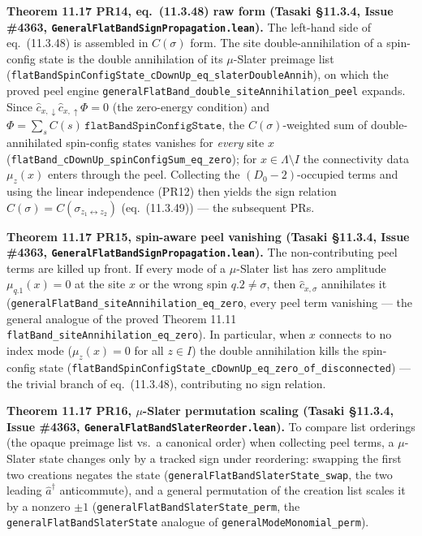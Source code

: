 \documentclass[a4paper,11pt]{article}
\begin{document}
\medskip\noindent\textbf{Theorem 11.17 PR14, eq.~(11.3.48) raw form (Tasaki §11.3.4, Issue \#4363,
\texttt{GeneralFlatBandSignPropagation.lean}).}  The left-hand side of eq.~(11.3.48) is assembled in
$C(\sigma)$ form.  The site double-annihilation of a spin-config state is the double annihilation of
its $\mu$-Slater preimage list (\texttt{flatBandSpinConfigState\_cDownUp\_eq\_slaterDoubleAnnih}),
on which the proved peel engine \texttt{generalFlatBand\_double\_siteAnnihilation\_peel} expands.
Since $\hat c_{x,\downarrow}\hat c_{x,\uparrow}\Phi=0$ (the zero-energy condition) and
$\Phi=\sum_s C(s)\,\texttt{flatBandSpinConfigState}$, the $C(\sigma)$-weighted sum of
double-annihilated spin-config states vanishes for \emph{every} site $x$
(\texttt{flatBand\_cDownUp\_spinConfigSum\_eq\_zero}); for $x\in\Lambda\setminus I$ the connectivity
data $\mu_z(x)$ enters through the peel.  Collecting the $(D_0{-}2)$-occupied terms and using the
linear independence (PR12) then yields the sign relation $C(\sigma)=C(\sigma_{z_1\leftrightarrow z_2})$
(eq.~(11.3.49)) --- the subsequent PRs.

\medskip\noindent\textbf{Theorem 11.17 PR15, spin-aware peel vanishing (Tasaki §11.3.4, Issue
\#4363, \texttt{GeneralFlatBandSignPropagation.lean}).}  The non-contributing peel terms are killed
up front.  If every mode of a $\mu$-Slater list has zero amplitude $\mu_{q.1}(x)=0$ at the site $x$
or the wrong spin $q.2\ne\sigma$, then $\hat c_{x,\sigma}$ annihilates it
(\texttt{generalFlatBand\_siteAnnihilation\_eq\_zero}, every peel term vanishing --- the general
analogue of the proved Theorem 11.11 \texttt{flatBand\_siteAnnihilation\_eq\_zero}).  In particular,
when $x$ connects to no index mode ($\mu_z(x)=0$ for all $z\in I$) the double annihilation kills the
spin-config state (\texttt{flatBandSpinConfigState\_cDownUp\_eq\_zero\_of\_disconnected}) --- the
trivial branch of eq.~(11.3.48), contributing no sign relation.

\medskip\noindent\textbf{Theorem 11.17 PR16, $\mu$-Slater permutation scaling (Tasaki §11.3.4,
Issue \#4363, \texttt{GeneralFlatBandSlaterReorder.lean}).}  To compare list orderings (the opaque
preimage list vs.\ a canonical order) when collecting peel terms, a $\mu$-Slater state changes only
by a tracked sign under reordering: swapping the first two creations negates the state
(\texttt{generalFlatBandSlaterState\_swap}, the two leading $\hat a^\dagger$ anticommute), and a
general permutation of the creation list scales it by a nonzero $\pm1$
(\texttt{generalFlatBandSlaterState\_perm}, the \texttt{generalFlatBandSlaterState} analogue of
\texttt{generalModeMonomial\_perm}).
\end{document}

